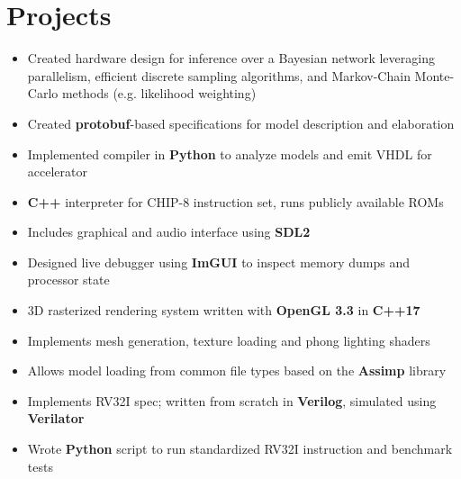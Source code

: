 \documentclass{moderncv}
\begin{document}
\section{Projects}
{\begin{itemize}
    \item Created hardware design for inference over a Bayesian network leveraging parallelism, efficient discrete sampling algorithms, and Markov-Chain Monte-Carlo methods (e.g. likelihood weighting)
    \item Created \textbf{protobuf}-based specifications for model description and elaboration
    \item Implemented compiler in \textbf{Python} to analyze models and emit VHDL for accelerator
\end{itemize}}

{\begin{itemize}
    \item \textbf{C++} interpreter for CHIP-8 instruction set, runs publicly available ROMs
    \item Includes graphical and audio interface using \textbf{SDL2}
    \item Designed live debugger using \textbf{ImGUI} to inspect memory dumps and processor state
\end{itemize}}

{\begin{itemize}
    \item 3D rasterized rendering system written with \textbf{OpenGL 3.3} in \textbf{C++17}
    \item Implements mesh generation, texture loading and phong lighting shaders
    \item Allows model loading from common file types based on the \textbf{Assimp} library
\end{itemize}}

{\begin{itemize}
    \item Implements RV32I spec; written from scratch in \textbf{Verilog}, simulated using \textbf{Verilator}
    \item Wrote \textbf{Python} script to run standardized RV32I instruction and benchmark tests
\end{itemize}}
\end{document}
